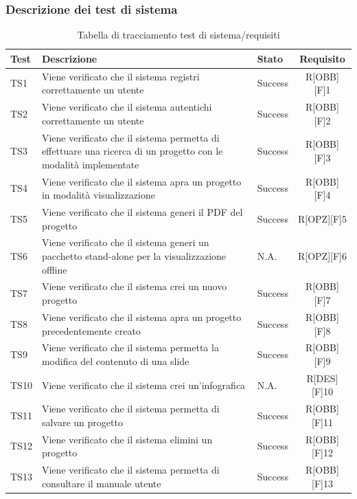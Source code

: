 \subsubsection{Descrizione dei test di sistema}
\begin{center}
	\begin{table}[h]
		\begin{tabular}{|l|p{}|l|c|}
			\toprule
			
			\textbf{Test} & \textbf{Descrizione} & \textbf{Stato} & \textbf{Requisito} \\
			
			\midrule
			TS1 & Viene verificato che il sistema registri correttamente un utente & Success & R[OBB][F]1\\ \midrule
			TS2 & Viene verificato che il sistema autentichi correttamente un utente & Success & R[OBB][F]2\\  \midrule
			TS3	& Viene verificato che il sistema permetta di effettuare una ricerca di un progetto con le modalità implementate & Success & R[OBB][F]3\\ \midrule
			TS4	& Viene verificato che il sistema apra un progetto in modalità visualizzazione & Success & R[OBB][F]4\\ \midrule
			TS5 & Viene verificato che il sistema generi il PDF del progetto & Success & R[OPZ][F]5\\ \midrule
			TS6 & Viene verificato che il sistema generi un pacchetto stand-alone per la visualizzazione offline & N.A. & R[OPZ][F]6\\ \midrule
			TS7 & Viene verificato che il sistema crei un nuovo progetto & Success & R[OBB][F]7\\ \midrule
			TS8 & Viene verificato che il sistema apra un progetto precedentemente creato & Success & R[OBB][F]8\\ \midrule
			TS9 & Viene verificato che il sistema permetta la modifica del contenuto di una \gls{slide} & Success & R[OBB][F]9\\ \midrule
			TS10 & Viene verificato che il sistema crei un'\gls{infografica} & N.A. & R[DES][F]10\\ \midrule
			TS11 & Viene verificato che il sistema permetta di salvare un progetto & Success & R[OBB][F]11\\ \midrule
			TS12 & Viene verificato che il sistema elimini un progetto & Success & R[OBB][F]12\\ \midrule
			TS13 & Viene verificato che il sistema permetta di consultare il manuale utente & Success & R[OBB][F]13\\
			
						
			\bottomrule
			
		\end{tabular}
		\caption{Tabella di tracciamento test di sistema/requisiti}
		
	\end{table}
	
\end{center}

